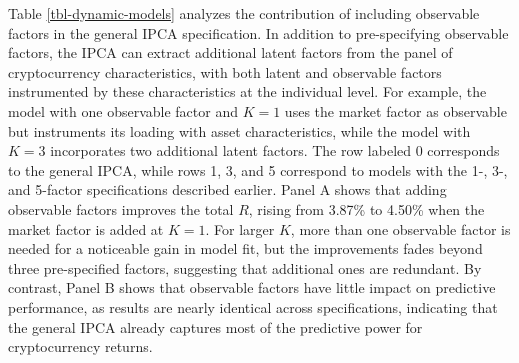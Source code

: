 \documentclass[
  12pt,
  a4paper,
  openany]{scrbook}
\begin{document}
Table \ref{tbl-dynamic-models} analyzes the contribution of including
observable factors in the general IPCA specification. In addition to
pre-specifying observable factors, the IPCA can extract additional
latent factors from the panel of cryptocurrency characteristics, with
both latent and observable factors instrumented by these characteristics
at the individual level. For example, the model with one observable
factor and \(K=1\) uses the market factor as observable but instruments
its loading with asset characteristics, while the model with \(K=3\)
incorporates two additional latent factors. The row labeled 0
corresponds to the general IPCA, while rows 1, 3, and 5 correspond to
models with the 1-, 3-, and 5-factor specifications described earlier.
Panel A shows that adding observable factors improves the total \(R\),
rising from 3.87\% to 4.50\% when the market factor is added at \(K=1\).
For larger \(K\), more than one observable factor is needed for a
noticeable gain in model fit, but the improvements fades beyond three
pre-specified factors, suggesting that additional ones are redundant. By
contrast, Panel B shows that observable factors have little impact on
predictive performance, as results are nearly identical across
specifications, indicating that the general IPCA already captures most
of the predictive power for cryptocurrency returns.
\end{document}

